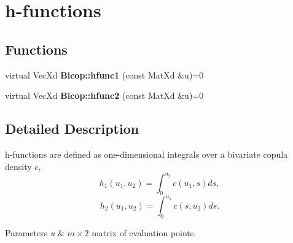 \hypertarget{group__hfunctions}{\section{h-\/functions}
\label{group__hfunctions}
}
\subsection*{Functions}
\begin{DoxyCompactItemize}
\item 
\hypertarget{group__hfunctions_gae44649cf8ce52f9401ab1dcda8630696}{virtual Vec\+Xd {\bfseries Bicop\+::hfunc1} (const Mat\+Xd \&u)=0}\label{group__hfunctions_gae44649cf8ce52f9401ab1dcda8630696}

\item 
\hypertarget{group__hfunctions_ga37d5edc7b3ced924b82849158374adb5}{virtual Vec\+Xd {\bfseries Bicop\+::hfunc2} (const Mat\+Xd \&u)=0}\label{group__hfunctions_ga37d5edc7b3ced924b82849158374adb5}

\end{DoxyCompactItemize}


\subsection{Detailed Description}
h-\/functions are defined as one-\/dimensional integrals over a bivariate copula density $ c $, \[ h_1(u_1, u_2) = \int_0^{u_2} c(u_1, s) ds, \] \[ h_2(u_1, u_2) = \int_0^{u_1} c(s, u_2) ds. \]


\begin{DoxyParams}{Parameters}
{\em u} & $m \times 2$ matrix of evaluation points. \\
\hline
\end{DoxyParams}
